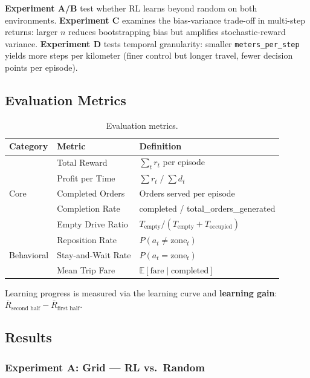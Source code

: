 \textbf{Experiment A/B} test whether RL learns beyond random on both environments. \textbf{Experiment C} examines the bias-variance trade-off in multi-step returns: larger $n$ reduces bootstrapping bias but amplifies stochastic-reward variance. \textbf{Experiment D} tests temporal granularity: smaller \texttt{meters\_per\_step} yields more steps per kilometer (finer control but longer travel, fewer decision points per episode).

\subsection{Evaluation Metrics}
\label{sec:metrics}

\begin{table}[ht]
\centering
\caption{Evaluation metrics.}
\label{tab:metrics}
\begin{tabular}{lll}
\toprule
\textbf{Category} & \textbf{Metric} & \textbf{Definition} \\
\midrule
\multirow{5}{*}{Core}
& Total Reward      & $\sum_t r_t$ per episode \\
& Profit per Time   & $\sum r_t \;/\; \sum d_t$ \\
& Completed Orders  & Orders served per episode \\
& Completion Rate   & completed / total\_orders\_generated \\
& Empty Drive Ratio & $T_{\text{empty}} / (T_{\text{empty}} + T_{\text{occupied}})$ \\
\midrule
\multirow{3}{*}{Behavioral}
& Reposition Rate    & $P(a_t \neq \text{zone}_t)$ \\
& Stay-and-Wait Rate & $P(a_t = \text{zone}_t)$ \\
& Mean Trip Fare     & $\mathbb{E}[\text{fare} \mid \text{completed}]$ \\
\bottomrule
\end{tabular}
\end{table}

Learning progress is measured via the learning curve and \textbf{learning gain}: $\bar{R}_{\text{second half}} - \bar{R}_{\text{first half}}$.

\subsection{Results}

\subsubsection{Experiment A: Grid — RL vs.\ Random}

